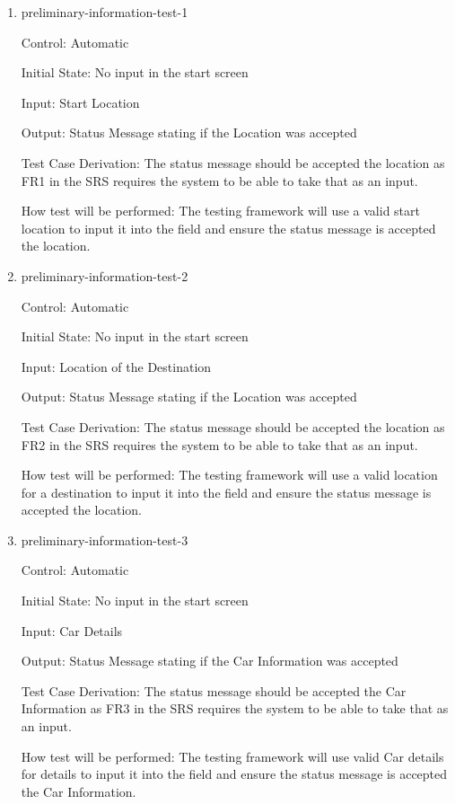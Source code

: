 \documentclass[12pt, titlepage]{article}
\begin{document}
\begin{enumerate}

\item{preliminary-information-test-1\\}

Control: Automatic
					
Initial State: No input in the start screen
					
Input: Start Location
					
Output: Status Message stating if the Location was accepted

Test Case Derivation: The status message should be accepted the location as FR1 in the SRS 
requires the system to be able to take that as an input.
					
How test will be performed: The testing framework will use a valid start location to input 
it into the field and ensure the status message is accepted the location.
					
\item{preliminary-information-test-2\\}

Control: Automatic
					
Initial State: No input in the start screen
					
Input: Location of the Destination
					
Output: Status Message stating if the Location was accepted

Test Case Derivation: The status message should be accepted the location as FR2 in the SRS 
requires the system to be able to take that as an input.
					
How test will be performed: The testing framework will use a valid location for a destination to input 
it into the field and ensure the status message is accepted the location.

\item{preliminary-information-test-3\\}

Control: Automatic
					
Initial State: No input in the start screen
					
Input: Car Details
					
Output: Status Message stating if the Car Information was accepted

Test Case Derivation: The status message should be accepted the Car Information as FR3 in the SRS 
requires the system to be able to take that as an input.
					
How test will be performed: The testing framework will use valid Car details for details to input 
it into the field and ensure the status message is accepted the Car Information.


\end{enumerate}
\end{document}
